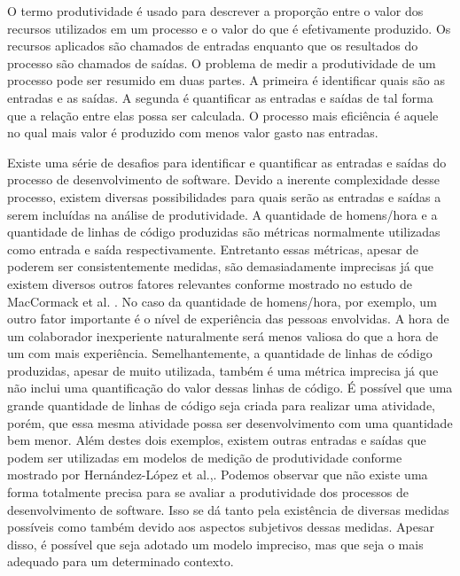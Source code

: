 O termo produtividade é usado para descrever a proporção entre o valor dos recursos utilizados em um processo e o valor do que é efetivamente produzido. Os recursos aplicados são chamados de entradas enquanto que os resultados do processo são chamados de saídas. O problema de medir a produtividade de um processo pode ser resumido em duas partes. A primeira é identificar quais são as entradas e as saídas. A segunda é quantificar  as entradas e saídas de tal forma que a relação entre elas possa ser calculada. O processo mais eficiência é aquele no qual mais valor é produzido com menos valor gasto nas entradas.

Existe uma série de desafios para identificar e quantificar as entradas e saídas do processo de desenvolvimento de software. Devido a inerente complexidade desse processo, existem diversas possibilidades para quais serão as entradas e saídas a serem incluídas na análise de produtividade. A quantidade de homens/hora e a quantidade de linhas de código produzidas são métricas normalmente utilizadas como entrada e saída respectivamente.  Entretanto essas métricas, apesar de poderem ser consistentemente medidas, são demasiadamente imprecisas já que existem diversos outros fatores relevantes conforme mostrado no estudo de MacCormack et al. \cite{maccormack2003trade}. No caso da quantidade de homens/hora, por exemplo, um outro fator importante é o nível de experiência das pessoas envolvidas. A hora de um colaborador inexperiente naturalmente será menos valiosa do que a hora de um com mais experiência. Semelhantemente, a quantidade de linhas de código produzidas, apesar de muito utilizada, também é uma métrica imprecisa já que não inclui uma quantificação do valor dessas linhas de código.  É possível que uma grande quantidade de linhas de código seja criada para realizar uma atividade, porém, que essa mesma atividade possa ser desenvolvimento com uma quantidade bem menor. Além destes dois exemplos, existem outras entradas e saídas que podem ser utilizadas em modelos de medição de produtividade conforme mostrado por Hernández-López et al.,\cite{hernandez2015productivity}. Podemos observar que não existe uma forma totalmente precisa para se avaliar a produtividade dos processos de desenvolvimento de software. Isso se dá tanto pela existência de diversas medidas possíveis como também devido aos aspectos subjetivos dessas medidas. Apesar disso, é possível que seja adotado um modelo impreciso, mas que seja o mais adequado para um determinado contexto.


